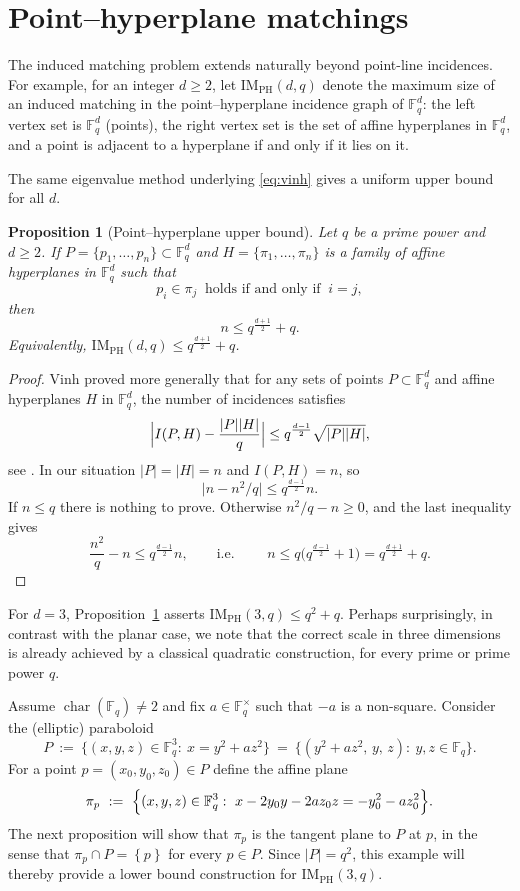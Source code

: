\documentclass[12pt,reqno]{amsart}
\theoremstyle{plain}
\newtheorem{proposition}[theorem]{Proposition}
\theoremstyle{definition}
\newcommand{\F}{\mathbb{F}}
\newcommand{\IMPH}{\mathrm{IM}_{\mathrm{PH}}}
\newcommand{\1}{\mathbf{1}}
\begin{document}
\section{Point--hyperplane matchings}\label{sec:higherdim}

The induced matching problem extends naturally beyond point-line incidences.  For example, for an integer $d\ge 2$, let
$\IMPH(d,q)$ denote the maximum size of an induced matching in the point--hyperplane incidence graph of $\F_q^d$: the left vertex set is $\F_q^d$
(points), the right vertex set is the set of affine hyperplanes in $\F_q^d$, and a point is adjacent
to a hyperplane if and only if it lies on it. 

The same eigenvalue method underlying \eqref{eq:vinh} gives a uniform upper bound for all $d$. 

\begin{proposition}[Point--hyperplane upper bound]\label{prop:point-hyperplane-upper}
  Let $q$ be a prime power and $d\ge 2$.  If $P=\{p_1,\dots,p_n\}\subset\F_q^d$ and
  $H=\{\pi_1,\dots,\pi_n\}$ is a family of affine hyperplanes in $\F_q^d$ such that
  \[ 
    p_i\in \pi_j\ \text{ holds if and only if }\ i=j, 
  \]
  then
  \[
    n\le q^{\frac{d+1}{2}}+q.
  \]
  Equivalently, $\IMPH(d,q)\le q^{\frac{d+1}{2}}+q$.
\end{proposition}

\begin{proof}
  Vinh \cite{Vinh2011ST} proved more generally that for any sets of points $P\subset\F_q^d$ and affine hyperplanes $H$ in $\F_q^d$,
  the number of incidences satisfies
  \[
    \Bigl|I(P,H)-\frac{|P||H|}{q}\Bigr|\le q^{\frac{d-1}{2}}\sqrt{|P||H|},
  \]
  see \cite{Vinh2011ST}.  In our situation $|P|=|H|=n$ and $I(P,H)=n$, so
  \[
    \bigl|n-n^2/q\bigr|\le q^{\frac{d-1}{2}}n.
  \]
  If $n\le q$ there is nothing to prove.  Otherwise $n^2/q-n\ge 0$, and the last inequality gives
  \[
    \frac{n^2}{q}-n\le q^{\frac{d-1}{2}}n,\qquad\text{i.e. }\qquad
    n\le q\bigl(q^{\frac{d-1}{2}}+1\bigr)=q^{\frac{d+1}{2}}+q.
  \]
\end{proof}

For $d=3$, Proposition~\ref{prop:point-hyperplane-upper} asserts $\IMPH(3,q)\le q^2+q$.
Perhaps surprisingly, in contrast with the planar case, we note that the correct scale in three dimensions is already achieved by a classical quadratic construction, for every prime or prime power $q$. 

Assume $\operatorname{char}(\F_q)\ne 2$ and fix $a\in\F_q^\times$ such that $-a$ is a non-square.
Consider the (elliptic) paraboloid
\[
  P\ :=\ \{(x,y,z)\in\F_q^3:\ x=y^2+a z^2\}\ =\ \{(y^2+a z^2,\,y,\,z):\ y,z\in\F_q\}.
\]
For a point $p=(x_0,y_0,z_0)\in P$ define the affine plane
\[
  \pi_p\ :=\ \Bigl\{(x,y,z)\in\F_q^3:\ x-2y_0y-2a z_0z= -y_0^2-a z_0^2\Bigr\}.
\]
The next proposition will show that $\pi_p$ is the tangent plane to $P$ at $p$, in the sense that $\pi_p \cap P = \left\{p\right\}$ for every $p \in P$. Since $|P|=q^2$, this example will thereby provide a lower bound construction for $\IMPH(3,q)$.
\end{document}
